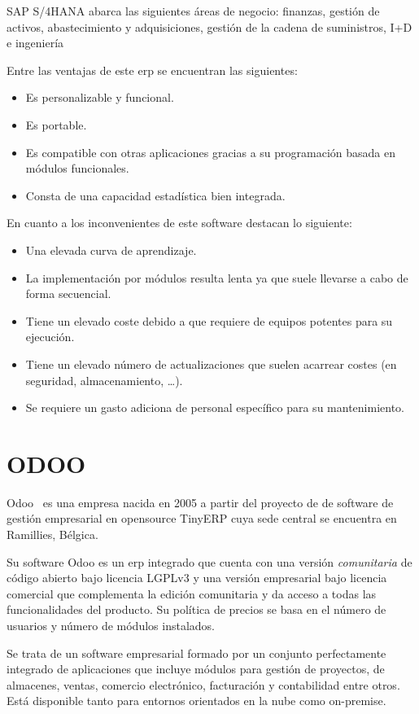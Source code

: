 SAP S/4HANA abarca las siguientes áreas de negocio: finanzas, gestión de activos, abastecimiento y adquisiciones, gestión de la cadena de suministros, I+D e ingeniería 


Entre las ventajas de este \acrshort{erp} se encuentran las siguientes:
\begin{itemize}
\item Es personalizable y funcional.
\item Es portable.
\item Es compatible con otras aplicaciones gracias a su programación basada en módulos funcionales.
\item Consta de una capacidad estadística bien integrada.
\end{itemize}


En cuanto a los inconvenientes de este software destacan lo siguiente:
\begin{itemize}
\item Una elevada curva de aprendizaje.
\item La implementación por módulos resulta lenta ya que suele llevarse a cabo de forma secuencial.
\item Tiene un elevado coste debido a que requiere de equipos potentes para su ejecución.
\item Tiene un elevado número de actualizaciones que suelen acarrear costes (en seguridad, almacenamiento, \dots).
\item Se requiere un gasto adiciona de personal específico para su mantenimiento.
\end{itemize}


\section{ODOO}
\label{sec:estado-arte-odoo}

Odoo~\cite{Odoo} es una empresa nacida en 2005 a partir del proyecto de de software de gestión empresarial en \gls{opensource} TinyERP cuya sede central se encuentra en Ramillies, Bélgica.

Su software Odoo es un \acrshort{erp} integrado que cuenta con una versión \textit{comunitaria} de código abierto bajo licencia LGPLv3 y una versión empresarial bajo licencia comercial que complementa la edición comunitaria y da acceso a todas las funcionalidades del producto. Su política de precios se basa en el número de usuarios y número de módulos instalados.

Se trata de un software empresarial formado por un conjunto perfectamente integrado de aplicaciones que incluye módulos para gestión de proyectos, de almacenes, ventas, comercio electrónico, facturación y contabilidad entre otros. Está disponible tanto para entornos orientados en la nube como on-premise.

